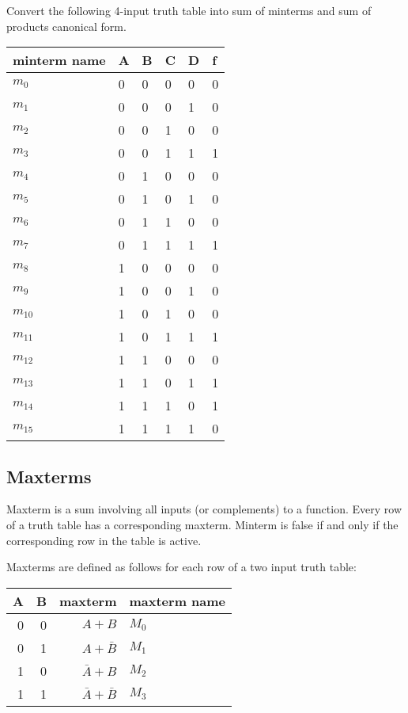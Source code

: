 \begin{prob}
  Convert the following 4-input truth table into sum of minterms and sum of products canonical form.

  \noindent
  \begin{tabular}{p{20mm}llll|l}
    \toprule
    minterm name & A & B & C & D & f \\
    \midrule
    $m_0$ & 0 & 0 & 0 & 0 & 0 \\ 
    $m_1$ & 0 & 0 & 0 & 1 & 0 \\ 
    $m_2$ & 0 & 0 & 1 & 0 & 0 \\ 
    $m_3$ & 0 & 0 & 1 & 1 & 1 \\ 
    $m_4$ & 0 & 1 & 0 & 0 & 0 \\ 
    $m_5$ & 0 & 1 & 0 & 1 & 0 \\ 
    $m_6$ & 0 & 1 & 1 & 0 & 0 \\ 
    $m_7$ & 0 & 1 & 1 & 1 & 1 \\ 
    $m_8$ & 1 & 0 & 0 & 0 & 0 \\ 
    $m_9$ & 1 & 0 & 0 & 1 & 0 \\ 
    $m_{10}$ & 1 & 0 & 1 & 0 & 0 \\
    $m_{11}$ & 1 & 0 & 1 & 1 & 1 \\
    $m_{12}$ & 1 & 1 & 0 & 0 & 0 \\
    $m_{13}$ & 1 & 1 & 0 & 1 & 1 \\
    $m_{14}$ & 1 & 1 & 1 & 0 & 1 \\
    $m_{15}$ & 1 & 1 & 1 & 1 & 0 \\
    \bottomrule
  \end{tabular}
\end{prob}


\subsection{Maxterms}
Maxterm is a sum involving all inputs (or complements) to a function.
Every row of a truth table has a corresponding maxterm.
Minterm is false if and only if the corresponding row in the table is active.

Maxterms are defined as follows for each row of a two input truth table:\\
\begin{tabular}{rrrp{20mm}}
  \toprule
  A & B &  maxterm & maxterm name\\
  \midrule
  0 & 0 &  $A + B$ & $M_0$ \\
  0 & 1 &  $A + \bar{B} $ & $M_1$ \\
  1 & 0 &  $\bar{A} + B$ & $M_2$ \\
  1 & 1 &  $\bar{A} + \bar{B} $ & $M_3$ \\
  \bottomrule
\end{tabular}\\[1em]

